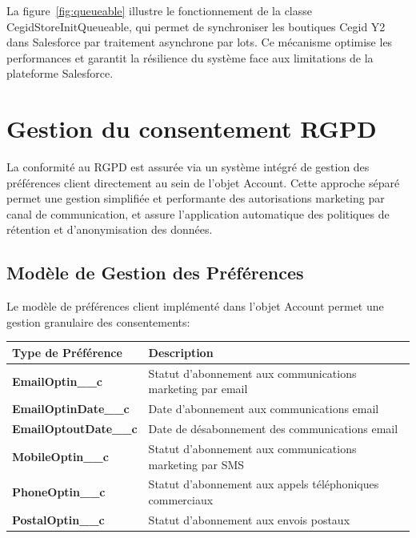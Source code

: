 La figure~\ref{fig:queueable} illustre le fonctionnement de la classe CegidStoreInitQueueable, qui permet de synchroniser les boutiques Cegid Y2 dans Salesforce par traitement asynchrone par lots. Ce mécanisme optimise les performances et garantit la résilience du système face aux limitations de la plateforme Salesforce.

\section{Gestion du consentement RGPD}

\begin{mdframed}[style=breakablegreen]
La conformité au RGPD est assurée via un système intégré de gestion des préférences client directement au sein de l'objet Account. Cette approche séparé permet une gestion simplifiée et performante des autorisations marketing par canal de communication, et assure l'application automatique des politiques de rétention et d'anonymisation des données.
\end{mdframed}

\subsection{Modèle de Gestion des Préférences}

Le modèle de préférences client implémenté dans l'objet Account permet une gestion granulaire des consentements:

\begin{center}
\begin{tabular}{|>{\bfseries}p{4.5cm}|p{10cm}|}
\hline
\rowcolor{lightblue} Type de Préférence & Description \\
\hline
EmailOptin\_\_c & Statut d'abonnement aux communications marketing par email \\
\hline
EmailOptinDate\_\_c & Date d'abonnement aux communications email \\
\hline
EmailOptoutDate\_\_c & Date de désabonnement des communications email \\
\hline
MobileOptin\_\_c & Statut d'abonnement aux communications marketing par SMS \\
\hline
PhoneOptin\_\_c & Statut d'abonnement aux appels téléphoniques commerciaux \\
\hline
PostalOptin\_\_c & Statut d'abonnement aux envois postaux \\
\hline
\end{tabular}
\end{center}

